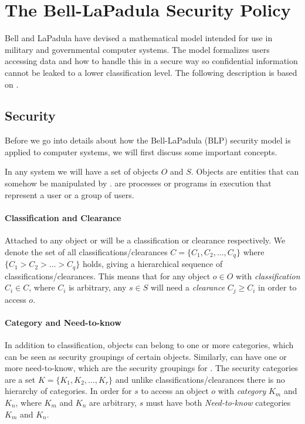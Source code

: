 \section{The Bell-LaPadula Security Policy}

Bell and LaPadula have devised a mathematical model intended for use in  military and governmental computer systems.
The model formalizes users accessing data and how to handle this in a secure way so confidential information cannot be leaked to a lower classification level.
The following description is based on \citet{lapadula1996secure}.

\subsection{Security}
Before we go into details about how the Bell-LaPadula (BLP) security model is applied to computer systems, we will first discuss some important concepts.

In any system we will have a set of objects $O$ and \subjects{} $S$.
Objects are entities that can somehow be manipulated by \subjects{}.
\Subjects{} are processes or programs in execution that represent a user or a group of users.

\paragraph{Classification and Clearance}
Attached to any object or \ssubject{} will be a classification or clearance respectively.
We denote the set of all classifications/clearances $C = \{C_1, C_2,\dots,C_q\}$ where $\{C_1 > C_2 > \dots > C_q\}$ holds, giving a hierarchical sequence of classifications/clearances.
This means that for any object $o \in O$ with \textit{classification} $C_i \in C$, where $C_i$ is arbitrary, any \ssubject{} $s \in S$ will need a \textit{clearance} $C_j \geq C_i$ in order to access $o$.

\paragraph{Category and Need-to-know}
In addition to classification, objects can belong to one or more categories, which can be seen as security groupings of certain objects.
Similarly, \subjects{} can have one or more need-to-know, which are the security groupings for \subjects{}.
The security categories are a set $K = \{K_1, K_2, \dots, K_r\}$ and unlike classifications/clearances there is no hierarchy of categories.
In order for \ssubject{} $s$ to access an object $o$ with \textit{category} $K_m$ and $K_n$, where $K_m$ and $K_n$ are arbitrary, $s$ must have both \textit{Need-to-know} categories $K_m$ and $K_n$.

